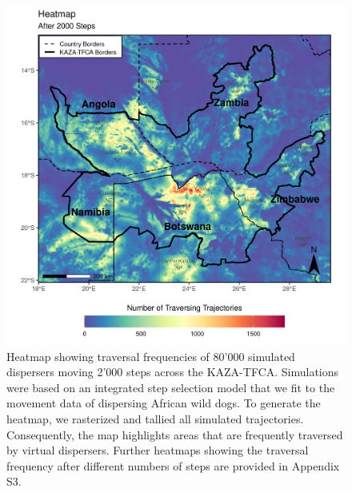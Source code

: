 \documentclass[abstract=on,10pt,a4paper,bibliography=totocnumbered]{article}
\begin{document}
\begin{figure}
  \includegraphics[width=\textwidth]{99_Heatmap.png}
  \caption{Heatmap showing traversal frequencies of 80'000 simulated dispersers
  moving 2'000 steps across the KAZA-TFCA. Simulations were based on an
  integrated step selection model that we fit to the movement data of dispersing
  African wild dogs. To generate the heatmap, we rasterized and tallied all
  simulated trajectories. Consequently, the map highlights areas that are
  frequently traversed by virtual dispersers. Further heatmaps showing the
  traversal frequency after different numbers of steps are provided in Appendix
  S3.}
  \label{Heatmap}
\end{figure}
\end{document}
